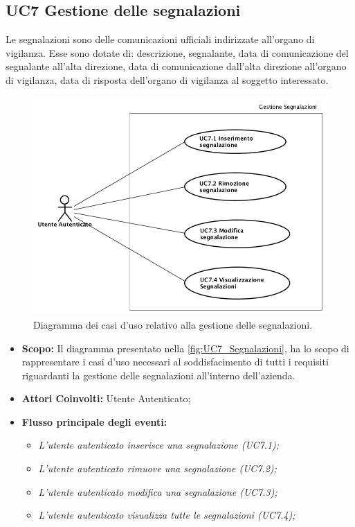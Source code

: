 	\newpage
	\subsection{UC7 Gestione delle segnalazioni}
		\label{section:UC7}	
		Le segnalazioni sono delle comunicazioni ufficiali indirizzate all'organo di vigilanza. Esse sono dotate di: descrizione, segnalante, data di comunicazione del segnalante all'alta direzione, data di comunicazione dall'alta direzione all'organo di vigilanza, data di risposta dell'organo di vigilanza al soggetto interessato.\\
		\begin{figure}[H]
			\begin{center}
				\includegraphics[width=12cm]{Pics/UC7Segnalazioni.png}
				\caption{Diagramma dei casi d'uso relativo alla gestione delle segnalazioni.}
				\label{fig:UC7_Segnalazioni}
			\end{center}
		\end{figure}
		
		\begin{itemize}
			\item \textbf{Scopo:} Il diagramma presentato nella \autoref{fig:UC7_Segnalazioni}, ha lo scopo di rappresentare i casi d'uso necessari al soddisfacimento di tutti i requisiti riguardanti la gestione delle segnalazioni all'interno dell'azienda. \\ 
			\item \textbf{Attori Coinvolti:} Utente Autenticato;
			\item \textbf{Flusso principale degli eventi:} 
			\begin{itemize}
				\item \textit{L'utente autenticato inserisce una segnalazione (UC7.1);}
				\item \textit{L'utente autenticato rimuove una segnalazione (UC7.2);}
				\item \textit{L'utente autenticato modifica una segnalazione (UC7.3);}
				\item \textit{L'utente autenticato visualizza tutte le segnalazioni (UC7.4);}
			\end{itemize}
		\end{itemize}
		
